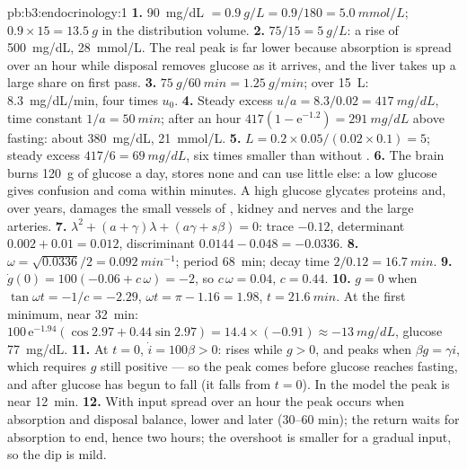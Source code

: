 \begin{solution}{pb:b3:endocrinology:1}
\textbf{1.} \qty{90}{mg/dL} $= \qty{0.9}{g/L} = 0.9/180 = \qty{5.0}{mmol/L}$;
$0.9\times 15 = \qty{13.5}{g}$ in the distribution volume.
\textbf{2.} $75/15 = \qty{5}{g/L}$: a rise of \qty{500}{mg/dL},
\qty{28}{mmol/L}. The real peak is far lower because absorption is
spread over an hour while disposal removes glucose as it arrives, and
the liver takes up a large share on first pass.
\textbf{3.} $\qty{75}{g}/\qty{60}{min} = \qty{1.25}{g/min}$; over
\qty{15}{L}: \qty{8.3}{mg/dL/min}, four times $u_{0}$.
\textbf{4.} Steady excess $u/a = 8.3/0.02 = \qty{417}{mg/dL}$, time
constant $1/a = \qty{50}{min}$; after an hour $417(1 -
\mathrm{e}^{-1.2}) = \qty{291}{mg/dL}$ above fasting: about
\qty{380}{mg/dL}, \qty{21}{mmol/L}.
\textbf{5.} $L = 0.2\times 0.05/(0.02\times 0.1) = 5$; steady excess
$417/6 = \qty{69}{mg/dL}$, six times smaller than without .
\textbf{6.} The brain burns \qty{120}{g} of glucose a day, stores none
and can use little else: a low glucose gives confusion and coma within
minutes. A high glucose glycates proteins and, over years, damages the
small vessels of , kidney and nerves and the large arteries.
\textbf{7.} $\lambda^{2} + (a + \gamma)\lambda + (a\gamma + s\beta) = 0$:
trace $-0.12$, determinant $0.002 + 0.01 = 0.012$, discriminant
$0.0144 - 0.048 = -0.0336$.
\textbf{8.} $\omega = \sqrt{0.0336}/2 = \qty{0.092}{min^{-1}}$; period
\qty{68}{min}; decay time $2/0.12 = \qty{16.7}{min}$.
\textbf{9.} $\dot g(0) = 100(-0.06 + c\,\omega) = -2$, so $c\,\omega =
0.04$, $c = 0.44$.
\textbf{10.} $g = 0$ when $\tan\omega t = -1/c = -2.29$, $\omega t =
\pi - 1.16 = 1.98$, $t = \qty{21.6}{min}$. At the first minimum, near
\qty{32}{min}: $100\,\mathrm{e}^{-1.94}(\cos 2.97 + 0.44\sin 2.97) =
14.4\times(-0.91) \approx -\qty{13}{mg/dL}$, glucose \qty{77}{mg/dL}.
\textbf{11.} At $t = 0$, $\dot i = 100\beta > 0$:  rises while
$g > 0$, and peaks when $\beta g = \gamma i$, which requires $g$ still
positive --- so the peak comes before glucose reaches fasting, and after
glucose has begun to fall (it falls from $t = 0$). In the model the peak
is near \qty{12}{min}.
\textbf{12.} With input spread over an hour the peak occurs when
absorption and disposal balance, lower and later (30--60 min); the
return waits for absorption to end, hence two hours; the 
overshoot is smaller for a gradual input, so the dip is mild.

\end{solution}
